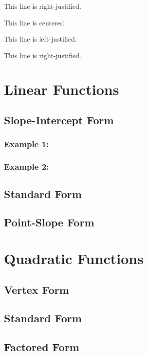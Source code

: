 \documentclass[11pt]{article}
\begin{document}
\begin{flushright}This line is right-justified.\end{flushright}

\tiny
This line is centered.

This line is left-justified.

This line is right-justified.

\section{Linear Functions}
	\subsection{Slope-Intercept Form}
		\subsubsection{Example 1:}
		\subsubsection{Example 2:}
	\subsection{Standard Form}
	\subsection{Point-Slope Form}
\section{Quadratic Functions}
	\subsection{Vertex Form}
	\subsection{Standard Form}
	\subsection{Factored Form}
\end{document}
